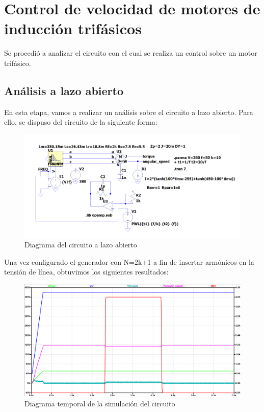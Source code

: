 \documentclass[e4_tp3_main.tex]{subfiles}
\begin{document}

\section{Control de velocidad de motores de inducción trifásicos}
Se procedió a analizar el circuito con el cual se realiza un control sobre un motor trifásico.
\subsection{Análisis a lazo abierto}
En esta etapa, vamos a realizar un análisis sobre el circuito a lazo abierto. Para ello, se dispuso del circuito de la siguiente forma:
\begin{figure}[H]
\centering
\includegraphics[width=0.5\linewidth]{Imagenes/3-1-a-circuito.png}
\caption{Diagrama del circuito a lazo abierto}
\end{figure}

Una vez configurado el generador con N=2k+1 a fin de insertar armónicos en la tensión de línea, obtuvimos los siguientes resultados:
\begin{figure}[H]
\centering
\includegraphics[width=0.75\linewidth]{Imagenes/3-1-a-general.png}
\caption{Diagrama temporal de la simulación del circuito}
\end{figure}
\end{document}
